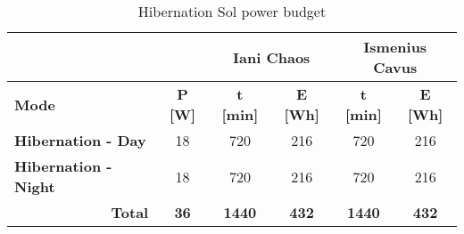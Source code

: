 \begin{table}[h]
\footnotesize
\centering
\caption{Hibernation Sol power budget}
\label{tab:hibernation-sol-power-budget}
\begin{tabular}{lc|c|c|c|c|}
\cline{3-6}
 & \textbf{} & \multicolumn{2}{c|}{\textbf{Iani Chaos}} & \multicolumn{2}{c|}{\textbf{Ismenius Cavus}} \\ \hline
\multicolumn{1}{|l|}{\textbf{Mode}} & \textbf{P {[}W{]}} & \textbf{t {[}min{]}} & \textbf{E {[}Wh{]}} & \textbf{t {[}min{]}} & \textbf{E {[}Wh{]}} \\ \hline
\multicolumn{1}{|l|}{\textbf{Hibernation - Day}} & 18 & 720 & 216 & 720 & 216 \\ \hline
\multicolumn{1}{|l|}{\textbf{Hibernation - Night}} & 18 & 720 & 216 & 720 & 216 \\ \hline
\multicolumn{1}{|r|}{\textbf{Total}} & \textbf{36} & \textbf{1440} & \textbf{432} & \textbf{1440} & \textbf{432} \\ \hline
\end{tabular}
\end{table}
